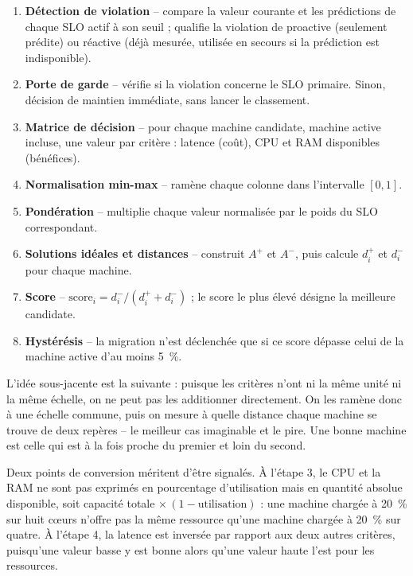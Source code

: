 \begin{enumerate}
    \item \textbf{Détection de violation} -- compare la valeur courante et les prédictions de chaque SLO actif à son seuil ; qualifie la violation de proactive (seulement prédite) ou réactive (déjà mesurée, utilisée en secours si la prédiction est indisponible).
    \item \textbf{Porte de garde} -- vérifie si la violation concerne le SLO primaire. Sinon, décision de maintien immédiate, sans lancer le classement.
    \item \textbf{Matrice de décision} -- pour chaque machine candidate, machine active incluse, une valeur par critère : latence (coût), CPU et RAM disponibles (bénéfices).
    \item \textbf{Normalisation min-max} -- ramène chaque colonne dans l'intervalle $[0,1]$.
    \item \textbf{Pondération} -- multiplie chaque valeur normalisée par le poids du SLO correspondant.
    \item \textbf{Solutions idéales et distances} -- construit $A^{+}$ et $A^{-}$, puis calcule $d_i^{+}$ et $d_i^{-}$ pour chaque machine.
    \item \textbf{Score} -- $\mathrm{score}_i = d_i^{-}/(d_i^{+} + d_i^{-})$ ; le score le plus élevé désigne la meilleure candidate.
    \item \textbf{Hystérésis} -- la migration n'est déclenchée que si ce score dépasse celui de la machine active d'au moins 5~\%.
\end{enumerate}

L'idée sous-jacente est la suivante : puisque les critères n'ont ni la même unité ni la même échelle, on ne peut pas les additionner directement. On les ramène donc à une échelle commune, puis on mesure à quelle distance chaque machine se trouve de deux repères -- le meilleur cas imaginable et le pire. Une bonne machine est celle qui est à la fois proche du premier et loin du second.

Deux points de conversion méritent d'être signalés. À l'étape 3, le CPU et la RAM ne sont pas exprimés en pourcentage d'utilisation mais en quantité absolue disponible, soit capacité totale $\times\,(1 - \mathrm{utilisation})$ : une machine chargée à 20~\% sur huit c\oe{}urs n'offre pas la même ressource qu'une machine chargée à 20~\% sur quatre. À l'étape 4, la latence est inversée par rapport aux deux autres critères, puisqu'une valeur basse y est bonne alors qu'une valeur haute l'est pour les ressources.

